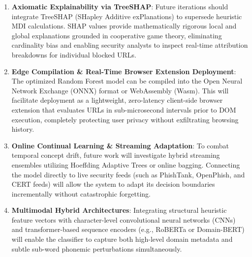 \begin{enumerate}
    \item \textbf{Axiomatic Explainability via TreeSHAP}:
    Future iterations should integrate TreeSHAP (SHapley Additive exPlanations) to supersede heuristic MDI calculations. SHAP values provide mathematically rigorous local and global explanations grounded in cooperative game theory, eliminating cardinality bias and enabling security analysts to inspect real-time attribution breakdowns for individual blocked URLs.
    
    \item \textbf{Edge Compilation \& Real-Time Browser Extension Deployment}:
    The optimized Random Forest model can be compiled into the Open Neural Network Exchange (ONNX) format or WebAssembly (Wasm). This will facilitate deployment as a lightweight, zero-latency client-side browser extension that evaluates URLs in sub-microsecond intervals prior to DOM execution, completely protecting user privacy without exfiltrating browsing history.
    
    \item \textbf{Online Continual Learning \& Streaming Adaptation}:
    To combat temporal concept drift, future work will investigate hybrid streaming ensembles utilizing Hoeffding Adaptive Trees or online bagging. Connecting the model directly to live security feeds (such as PhishTank, OpenPhish, and CERT feeds) will allow the system to adapt its decision boundaries incrementally without catastrophic forgetting.
    
    \item \textbf{Multimodal Hybrid Architectures}:
    Integrating structural heuristic feature vectors with character-level convolutional neural networks (CNNs) and transformer-based sequence encoders (e.g., RoBERTa or Domain-BERT) will enable the classifier to capture both high-level domain metadata and subtle sub-word phonemic perturbations simultaneously.
\end{enumerate}
